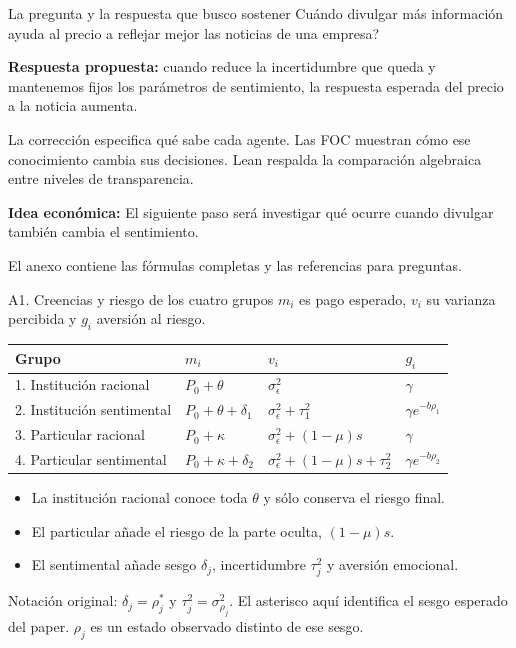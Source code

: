\documentclass[aspectratio=169,11pt]{beamer}
\newcommand{\idea}[1]{\par\medskip\textbf{Idea económica:} #1}
\begin{document}
\begin{frame}{La pregunta y la respuesta que busco sostener}
 \large
 \textquestiondown{}Cuándo divulgar más información ayuda al precio a reflejar
 mejor las noticias de una empresa?
 \par\normalsize\bigskip
 \textbf{Respuesta propuesta:} cuando reduce la incertidumbre que queda
 y mantenemos fijos los parámetros de sentimiento, la respuesta esperada
 del precio a la noticia aumenta.
 \medskip
 \par La corrección especifica qué sabe cada agente.
 Las FOC muestran cómo ese conocimiento cambia sus decisiones.
 Lean respalda la comparación algebraica entre niveles de transparencia.
 \idea{El siguiente paso será investigar qué ocurre cuando divulgar también cambia el sentimiento.}
 \small\par\medskip
 El anexo contiene las fórmulas completas y las referencias para preguntas.
\end{frame}
\appendix
\begin{frame}{A1. Creencias y riesgo de los cuatro grupos}
 \small
 \(m_i\) es pago esperado, \(v_i\) su varianza percibida y \(g_i\) aversión al riesgo.
 \begin{center}
 \begin{tabular}{@{}llll@{}}
 \toprule
 Grupo & \(m_i\) & \(v_i\) & \(g_i\)\\
 \midrule
 1. Institución racional & \(P_0+\theta\) & \(\sigma_\epsilon^2\) & \(\gamma\)\\
 2. Institución sentimental & \(P_0+\theta+\delta_1\) & \(\sigma_\epsilon^2+\tau_1^2\) & \(\gamma e^{-b\rho_1}\)\\
 3. Particular racional & \(P_0+\kappa\) & \(\sigma_\epsilon^2+(1-\mu)s\) & \(\gamma\)\\
 4. Particular sentimental & \(P_0+\kappa+\delta_2\) & \(\sigma_\epsilon^2+(1-\mu)s+\tau_2^2\) & \(\gamma e^{-b\rho_2}\)\\
 \bottomrule
 \end{tabular}
 \end{center}
 \normalsize
 \begin{itemize}
  \item La institución racional conoce toda \(\theta\) y sólo conserva el riesgo final.
  \item El particular añade el riesgo de la parte oculta, \((1-\mu)s\).
  \item El sentimental añade sesgo \(\delta_j\), incertidumbre \(\tau_j^2\)
        y aversión emocional.
 \end{itemize}
 \small
 Notación original: \(\delta_j=\rho_j^*\) y \(\tau_j^2=\sigma_{\rho_j}^2\).
 El asterisco aquí identifica el sesgo esperado del paper.
 \(\rho_j\) es un estado observado distinto de ese sesgo.
\end{frame}
\end{document}
